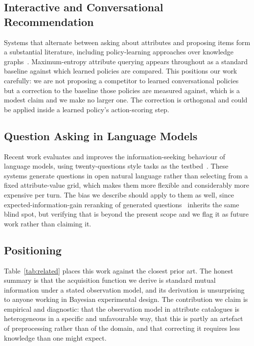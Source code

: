 \documentclass[conference]{IEEEtran}
\begin{document}
\subsection{Interactive and Conversational Recommendation}

Systems that alternate between asking about attributes and proposing items form
a substantial literature, including policy-learning approaches over
knowledge graphs~\cite{lei2020ear,lei2020cpr,deng2021unicorn}. Maximum-entropy
attribute querying appears throughout as a standard baseline against which
learned policies are compared. This positions our work carefully: we are not
proposing a competitor to learned conversational policies but a correction to
the baseline those policies are measured against, which is a modest claim and
we make no larger one. The correction is orthogonal and could be applied inside
a learned policy's action-scoring step.

\subsection{Question Asking in Language Models}

Recent work evaluates and improves the information-seeking behaviour of
language models, using twenty-questions style tasks as the
testbed~\cite{debruyn2022,mazzaccara2024,hu2024uot}. These systems generate
questions in open natural language rather than selecting from a fixed
attribute-value grid, which makes them more flexible and considerably more
expensive per turn. The bias we describe should apply to them as well, since
expected-information-gain reranking of generated
questions~\cite{mazzaccara2024} inherits the same blind spot, but verifying
that is beyond the present scope and we flag it as future work rather than
claiming it.

\subsection{Positioning}

Table~\ref{tab:related} places this work against the closest prior art. The
honest summary is that the acquisition function we derive is standard mutual
information under a stated observation model, and its derivation is
unsurprising to anyone working in Bayesian experimental design. The
contribution we claim is empirical and diagnostic: that the observation model
in attribute catalogues is heterogeneous in a specific and unfavourable way,
that this is partly an artefact of preprocessing rather than of the domain, and
that correcting it requires less knowledge than one might expect.
\end{document}
